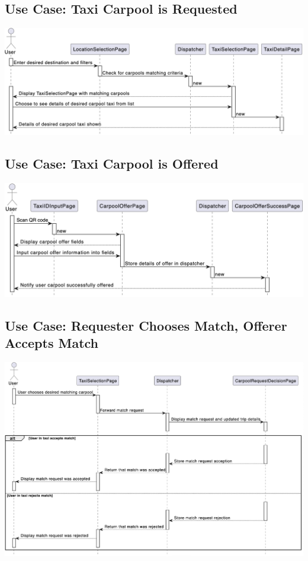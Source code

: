 \documentclass[]{article}
\begin{document}
\subsection*{Use Case: Taxi Carpool is Requested}
\includegraphics[scale=0.45]{Sequence Diagrams/GS4.png}

\subsection*{Use Case: Taxi Carpool is Offered}
\includegraphics[scale=0.45]{Sequence Diagrams/GS5.png}

\subsection*{Use Case: Requester Chooses Match, Offerer Accepts Match}
\includegraphics[scale=0.45]{Sequence Diagrams/GS8.png}
\end{document}
